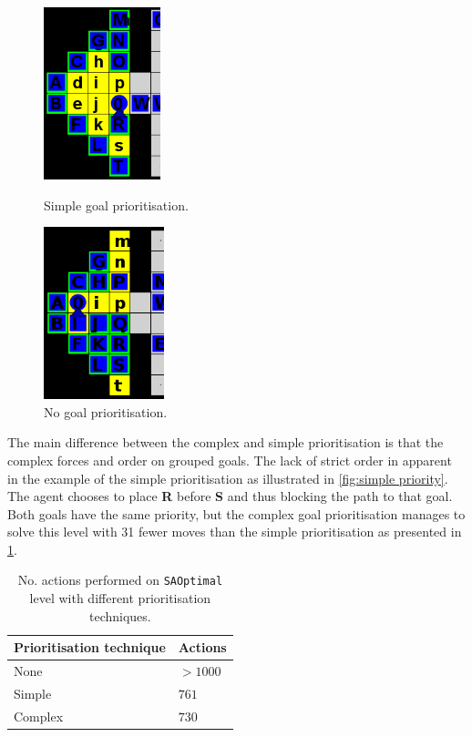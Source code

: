 \begin{figure}[h!]
  \centering
  \begin{minipage}{.45\columnwidth}
    \centering
    \includegraphics[height=5cm]{graphics/simple_priority_block.PNG}
    \caption{\label{fig:simple priority}Simple goal prioritisation.}
  \end{minipage}%
  \hspace{20pt}%
  \begin{minipage}{.45\columnwidth}
    \centering
    \includegraphics[height=5cm]{graphics/no_priority_block.png}
    \caption{\label{fig:no priority}No goal prioritisation.}
  \end{minipage}
\end{figure}

The main difference between the complex and simple prioritisation is that the complex forces and order on grouped goals.
The lack of strict order in apparent in the example of the simple prioritisation as illustrated in \cref{fig:simple priority}.
The agent chooses to place \textbf{R} before \textbf{S} and thus blocking the path to that goal.
Both goals have the same priority, but the complex goal prioritisation manages to solve this level with 31 fewer moves than the simple prioritisation as presented in \cref{tab:SAOptimal_results}.

\begin{table}[h!]
  \centering
  \begin{tabular}{@{}ll@{}}
    \toprule
    Prioritisation technique & Actions \\ 
    \midrule
    None    & $>1000$ \\ 
    Simple  & $761$ \\ 
    Complex & $730$ \\
    \bottomrule
  \end{tabular}
  \caption{\label{tab:SAOptimal_results}No. actions performed on \texttt{SAOptimal} level with different prioritisation techniques.}
\end{table}


